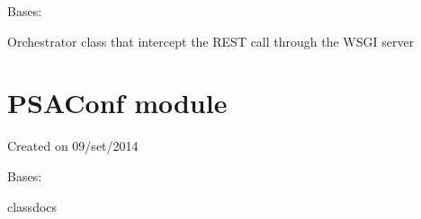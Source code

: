 \documentclass[letterpaper,10pt,oneside]{sphinxmanual}
\begin{document}
\begin{fulllineitems}
\label{Orchestrator:Orchestrator.Orchestrator}
Bases: 

Orchestrator class that intercept the REST call through the WSGI server

\begin{fulllineitems}
\label{Orchestrator:Orchestrator.Orchestrator.on_delete}
\end{fulllineitems}


\begin{fulllineitems}
\label{Orchestrator:Orchestrator.Orchestrator.on_get}
\end{fulllineitems}


\begin{fulllineitems}
\label{Orchestrator:Orchestrator.Orchestrator.on_put}
\end{fulllineitems}


\end{fulllineitems}



\chapter{PSAConf module}
\label{PSAConf::doc}\label{PSAConf:psaconf-module}\label{PSAConf:module-PSAConf}
Created on 09/set/2014

\begin{fulllineitems}
\label{PSAConf:PSAConf.PSAConf}
Bases: 

classdocs

\begin{fulllineitems}
\label{PSAConf:PSAConf.PSAConf.get_client_address}
\end{fulllineitems}


\begin{fulllineitems}
\label{PSAConf:PSAConf.PSAConf.on_get}
\end{fulllineitems}


\end{fulllineitems}
\end{document}
